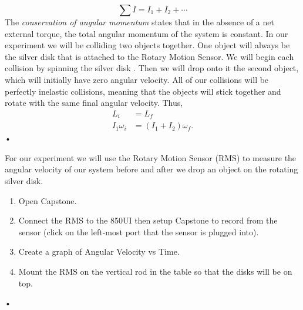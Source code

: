 \documentclass[main.tex]{subfiles}
\begin{document}
\[
\sum I=I_1+I_2+\dotsb
\]
The \emph{conservation of angular momentum} states that in the absence of a net external torque, the total angular momentum of the system is constant. In our experiment we will be colliding two objects together. One object will always be the silver disk that is attached to the Rotary Motion Sensor. We will begin each collision by spinning the silver disk . Then we will drop onto it the second object, which will initially have zero angular velocity. All of our collisions will be perfectly inelastic collisions, meaning that the objects will stick together and rotate with the same final angular velocity. Thus,
\begin{align}
L_i&=L_f \nonumber\\
I_1\omega_i &= (I_1+I_2)\omega_f. \label{eq:ConsAngMom}
\end{align}•

For our experiment we will use the Rotary Motion Sensor (RMS) to measure the angular velocity of our system before and after we drop an object on the rotating silver disk.
\begin{enumerate}
\item
Open Capstone.
\item
Connect the RMS to the 850UI then setup Capstone to record from the sensor (click on the left-most port that the sensor is plugged into).
\item
Create a graph of Angular Velocity vs Time.
\item
Mount the RMS on the vertical rod in the table so that the disks will be on top.
\end{enumerate}•
\end{document}
